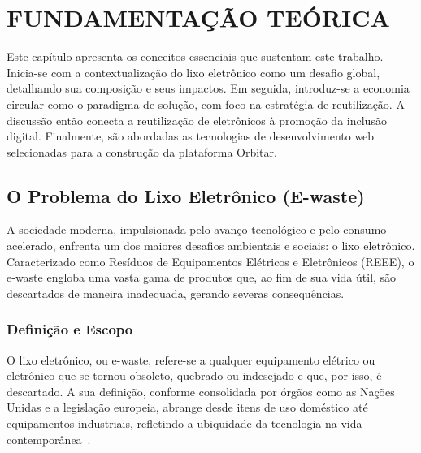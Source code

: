 \documentclass[
	12pt,				%
	openright,			%
	oneside,			%
	a4paper,			%
	english,			%
	brazil				%
	]{abntex2}
\theoremstyle{definition}
\begin{document}
\chapter{FUNDAMENTAÇÃO TEÓRICA}

Este capítulo apresenta os conceitos essenciais que sustentam este trabalho. Inicia-se com a contextualização do lixo eletrônico como um desafio global, detalhando sua composição e seus impactos. Em seguida, introduz-se a economia circular como o paradigma de solução, com foco na estratégia de reutilização. A discussão então conecta a reutilização de eletrônicos à promoção da inclusão digital. Finalmente, são abordadas as tecnologias de desenvolvimento web selecionadas para a construção da plataforma Orbitar.

\section{O Problema do Lixo Eletrônico (E-waste)}

A sociedade moderna, impulsionada pelo avanço tecnológico e pelo consumo acelerado, enfrenta um dos maiores desafios ambientais e sociais: o lixo eletrônico. Caracterizado como Resíduos de Equipamentos Elétricos e Eletrônicos (REEE), o e-waste engloba uma vasta gama de produtos que, ao fim de sua vida útil, são descartados de maneira inadequada, gerando severas consequências.

\subsection{Definição e Escopo}

O lixo eletrônico, ou e-waste, refere-se a qualquer equipamento elétrico ou eletrônico que se tornou obsoleto, quebrado ou indesejado e que, por isso, é descartado. A sua definição, conforme consolidada por órgãos como as Nações Unidas e a legislação europeia, abrange desde itens de uso doméstico até equipamentos industriais, refletindo a ubiquidade da tecnologia na vida contemporânea~\cite{Forti2020, EUWEEE2012}.
\end{document}
